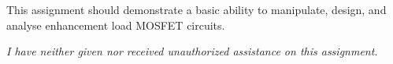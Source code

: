 \documentclass[12pt,letterpaper,titlepage]{article}
\begin{document}
\begin{raggedright}
%
%
%
%
%
%

This assignment should demonstrate a basic ability to manipulate, design, and analyse enhancement load MOSFET circuits.

\textit{I have neither given nor received unauthorized assistance on this assignment.}


\end{raggedright}
\end{document}
